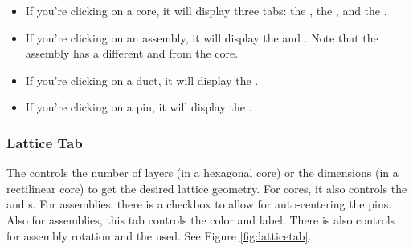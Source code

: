 \begin{itemize}
	\item{If you're clicking on a core, it will display three tabs: the , the , and the .}
	\item{If you're clicking on an assembly, it will display the  and .  Note that the assembly has a different  and  from the core.}
	\item{If you're clicking on a duct, it will display the .}
	\item{If you're clicking on a pin, it will display the .}
\end{itemize}

\subsubsection{Lattice Tab}
The  controls the number of layers (in a hexagonal core) or the dimensions (in a rectilinear core) to get the desired lattice geometry.  For cores, it also controls the  and s.  For assemblies, there is a checkbox to allow for auto-centering the pins.  Also for assemblies, this tab controls the  color and label.  There is also controls for assembly rotation and the  used.  See Figure \ref{fig:latticetab}.

